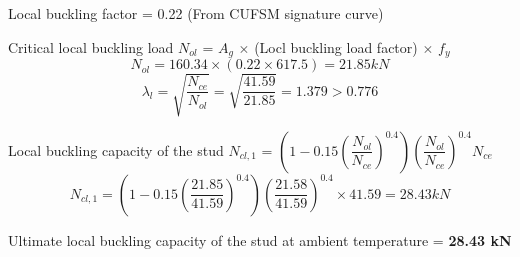 Local buckling factor = 0.22 (From CUFSM signature curve)

Critical local buckling load $N_{ol}$ = $A_g$ $\times$ (Locl buckling load factor) $\times$ $f_y$
\begin{equation*}
    N_{ol} = 160.34 \times (0.22 \times 617.5) = 21.85 kN
\end{equation*}
\begin{equation*}
    \lambda_l = \sqrt{\dfrac{N_{ce}}{N_{ol}}}
    = \sqrt{\dfrac{41.59}{21.85}} = 1.379 > 0.776
\end{equation*}

Local buckling capacity of the stud $N_{cl,1}$ = $\left(1-0.15\left(\dfrac{N_{ol}}{N_{ce}}\right)^{0.4}\right)\left(\dfrac{N_{ol}}{N_{ce}}\right)^{0.4}N_{ce}$
\begin{equation*}
    N_{cl,1} = \left(1-0.15\left(\dfrac{21.85}{41.59}\right)^{0.4}\right)\left(\dfrac{21.58}{41.59}\right)^{0.4} \times 41.59 = 28.43 kN
\end{equation*}

Ultimate local buckling capacity of the stud at ambient temperature = \textbf{28.43 kN}




